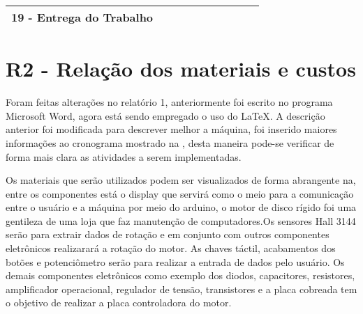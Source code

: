 \documentclass[journal]{IEEEtran}
\begin{document}
\begin{table}[!htbp]
\begin{tabular}{c|l|l|l|l|l|l|l|l|l|}
\multicolumn{1}{|c|}{19 - Entrega do Trabalho}                                                                                & \multicolumn{1}{c|}{}  & \multicolumn{1}{c|}{}  & \multicolumn{1}{c|}{}  & \multicolumn{1}{c|}{}  & \multicolumn{1}{c|}{}  & \multicolumn{1}{c|}{}  & \multicolumn{1}{c|}{}  & \multicolumn{1}{c|}{}  &                        \\ \hline
\end{tabular}
\end{table}



\section{R2 - Relação dos materiais e custos}
Foram feitas alterações no relatório 1, anteriormente foi escrito no programa Microsoft Word, agora está sendo empregado o uso do \LaTeX. A descrição anterior foi modificada para descrever melhor a máquina, foi inserido maiores informações ao cronograma mostrado na \cite{tab:tabela2}, desta maneira pode-se verificar de forma mais clara as atividades a serem implementadas.

Os materiais que serão utilizados podem ser visualizados de forma abrangente na, entre os componentes está o display que servirá como o meio para a comunicação entre o usuário e a máquina por meio do arduino, o motor de disco rígido foi uma gentileza de uma loja que faz manutenção de computadores.Os sensores Hall 3144 serão para extrair dados de rotação e em conjunto com outros componentes eletrônicos realizarará a rotação do motor. As chaves táctil, acabamentos dos botões e potenciômetro serão para realizar a entrada de dados pelo usuário. Os demais componentes eletrônicos como exemplo dos diodos, capacitores, resistores, amplificador operacional, regulador de tensão, transistores e a placa cobreada tem o objetivo de realizar a placa controladora do motor.
\end{document}
